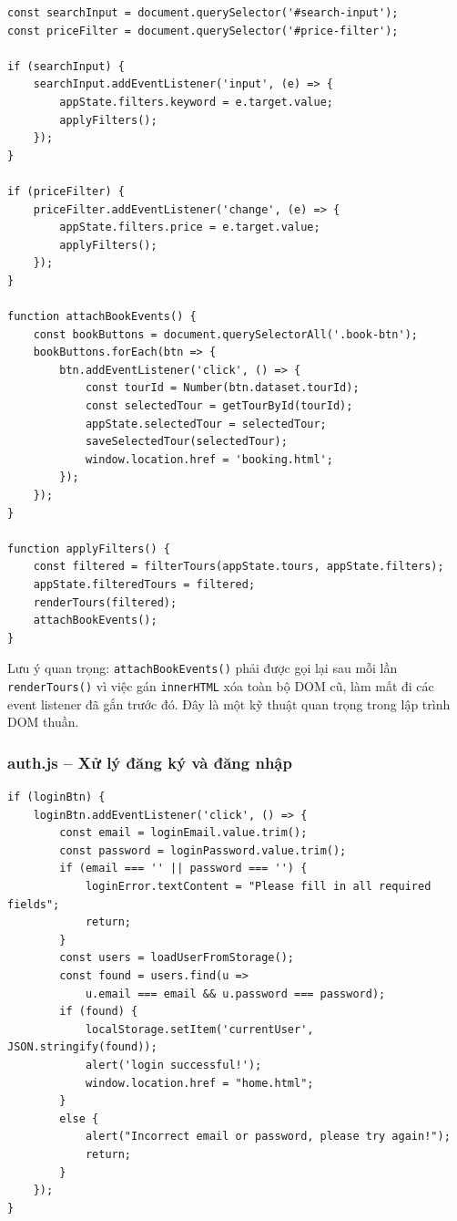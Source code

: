 \documentclass[12pt,a4paper]{article}
\begin{document}
\begin{lstlisting}[caption={MODULES/tour.js -- Gắn sự kiện tìm kiếm và lọc}]
const searchInput = document.querySelector('#search-input');
const priceFilter = document.querySelector('#price-filter');

if (searchInput) {
    searchInput.addEventListener('input', (e) => {
        appState.filters.keyword = e.target.value;
        applyFilters();
    });
}

if (priceFilter) {
    priceFilter.addEventListener('change', (e) => {
        appState.filters.price = e.target.value;
        applyFilters();
    });
}

function attachBookEvents() {
    const bookButtons = document.querySelectorAll('.book-btn');
    bookButtons.forEach(btn => {
        btn.addEventListener('click', () => {
            const tourId = Number(btn.dataset.tourId);
            const selectedTour = getTourById(tourId);
            appState.selectedTour = selectedTour;
            saveSelectedTour(selectedTour);
            window.location.href = 'booking.html';
        });
    });
}

function applyFilters() {
    const filtered = filterTours(appState.tours, appState.filters);
    appState.filteredTours = filtered;
    renderTours(filtered);
    attachBookEvents();
}
\end{lstlisting}

Lưu ý quan trọng: \texttt{attachBookEvents()} phải được gọi lại sau mỗi lần \texttt{renderTours()} vì việc gán \texttt{innerHTML} xóa toàn bộ DOM cũ, làm mất đi các event listener đã gắn trước đó. Đây là một kỹ thuật quan trọng trong lập trình DOM thuần.

\subsubsection{auth.js -- Xử lý đăng ký và đăng nhập}

\begin{lstlisting}[caption={MODULES/auth.js -- Xử lý sự kiện đăng nhập}]
if (loginBtn) {
    loginBtn.addEventListener('click', () => {
        const email = loginEmail.value.trim();
        const password = loginPassword.value.trim();
        if (email === '' || password === '') {
            loginError.textContent = "Please fill in all required fields";
            return;
        }
        const users = loadUserFromStorage();
        const found = users.find(u =>
            u.email === email && u.password === password);
        if (found) {
            localStorage.setItem('currentUser', JSON.stringify(found));
            alert('login successful!');
            window.location.href = "home.html";
        }
        else {
            alert("Incorrect email or password, please try again!");
            return;
        }
    });
}
\end{lstlisting}
\end{document}
